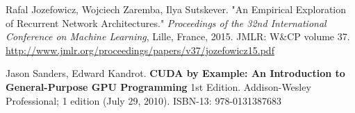 \documentclass[10pt]{amsart}
\begin{document}
\begin{thebibliography}{9}
Rafal Jozefowicz, Wojciech Zaremba, Ilya Sutskever.  "An Empirical Exploration of Recurrent Network Architectures."  \emph{Proceedings of the 32nd
International  Conference on  Machine Learning}, Lille, France, 2015.  JMLR: W\&CP volume 37.  \url{http://www.jmlr.org/proceedings/papers/v37/jozefowicz15.pdf} 

Jason Sanders, Edward Kandrot.  \textbf{CUDA by Example: An Introduction to General-Purpose GPU Programming} 1st Edition.  Addison-Wesley Professional; 1 edition (July 29, 2010).  ISBN-13: 978-0131387683
  
\end{thebibliography}
\end{document}
